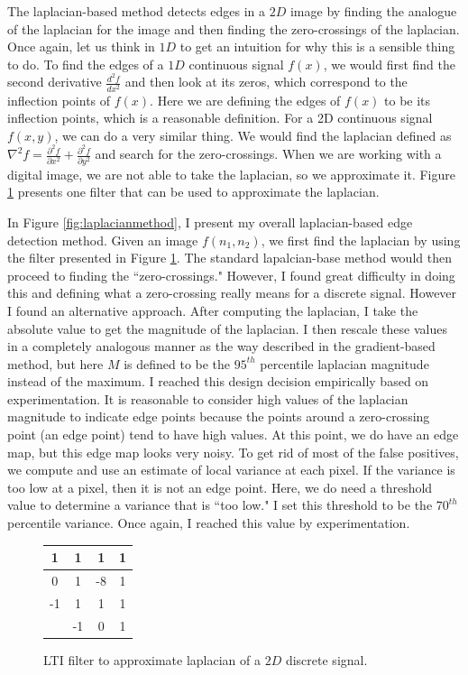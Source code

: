 \documentclass[12pt]{amsart}
\begin{document}
The laplacian-based method detects edges in a $2D$ image by finding the analogue of the laplacian for the image and then finding the zero-crossings of the laplacian. Once again, let us think in $1D$ to get an intuition for why this is a sensible thing to do. To find the edges of a $1D$ continuous signal $f(x)$, we would first find the second derivative $\frac{d^2f}{dx^2}$ and then look at its zeros, which correspond to the inflection points of $f(x)$. Here we are defining the edges of $f(x)$ to be its inflection points, which is a reasonable definition. For a 2D continuous signal $f(x,y)$, we can do a very similar thing. We would find the laplacian defined as $\nabla^2f = \frac{\partial^2f}{\partial x^2} +  \frac{\partial^2f}{\partial y^2}$ and search for the zero-crossings. When we are working with a digital image, we are not able to take the laplacian, so we approximate it. Figure \ref{fig:laplacianfilter} presents one filter that can be used to approximate the laplacian.

In Figure  \ref{fig:laplacianmethod}, I present my overall laplacian-based edge detection method. Given an image $f(n_1, n_2)$, we first find the laplacian by using the filter presented in Figure \ref{fig:laplacianfilter}. The standard lapalcian-base method would then proceed to finding the ``zero-crossings." However, I found great difficulty in doing this and defining what a zero-crossing really means for a discrete signal. However I found an alternative approach. After computing the laplacian, I take the absolute value to get the magnitude of the laplacian. I then rescale these values in a completely analogous manner as the way described in the gradient-based method, but here $M$ is defined to be the $95^{th}$ percentile laplacian magnitude instead of the maximum. I reached this design decision empirically based on experimentation. It is reasonable to consider high values of the laplacian magnitude to indicate edge points because the points around a zero-crossing point (an edge point) tend to have high values. At this point, we do have an edge map, but this edge map looks very noisy. To get rid of most of the false positives, we compute and use an estimate of local variance at each pixel. If the variance is too low at a pixel, then it is not an edge point. Here, we do need a threshold value to determine a variance that is ``too low." I set this threshold to be the $70^{th}$ percentile variance. Once again, I reached this value by experimentation.

\begin{figure}
\centering
\begin{tabular}{c || c | c | c }
{\color{light-gray}1} & 1 & 1 & 1 \\
\hline
{\color{light-gray}0} & 1 & -8 & 1 \\
\hline
{\color{light-gray}-1} & 1 & 1 & 1 \\
\hline\hline
& {\color{light-gray}-1} & {\color{light-gray}0} & {\color{light-gray}1} \\
\end{tabular}
\caption{LTI filter to approximate laplacian of a $2D$ discrete signal.}
\label{fig:laplacianfilter}
\end{figure}
\end{document}
